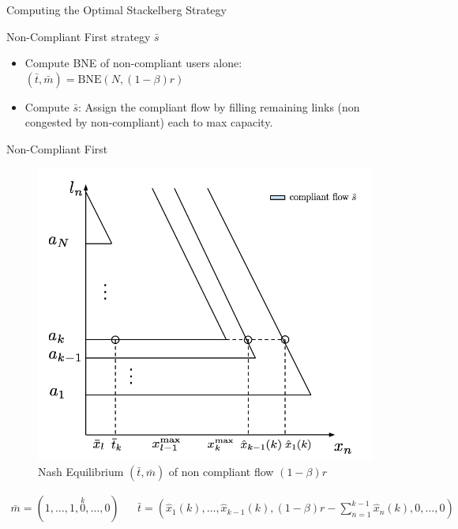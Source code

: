 \documentclass[xcolor=svgnames, english, smaller]{beamer}
\theoremstyle{plain}
\theoremstyle{definition}
\theoremstyle{plain}
\theoremstyle{plain}
\begin{document}
\begin{frame}{Computing the Optimal Stackelberg Strategy}

\begin{block}{Non-Compliant First strategy $\bar{s}$}
\begin{itemize}
\item \alert{Compute BNE of non-compliant users alone: $(\bar{t}, \bar{m}) = \text{BNE}(N, (1-\beta)r)$}
\item Compute $\bar{s}$: Assign the compliant flow by filling remaining links (non congested by non-compliant) each to max capacity.
\end{itemize}
\end{block}

\end{frame}



\begin{frame}{Non-Compliant First}

\begin{figure}
\begin{center}
\includegraphics[scale=0.25]{../../figures/presentation/optimal_stackelberg1.png}
\caption{Nash Equilibrium $(\bar{t}, \bar{m})$ of non compliant flow $(1-\beta)r$}
\end{center}
\end{figure}

\small
\begin{align*}
\bar{m} = (1, \dots, 1, \overset{k}{0}, \dots, 0) &&
\bar{t} = \left( \hat{x}_1(k), \dots, \hat{x}_{k-1}(k), (1-\beta)r - \sum_{n = 1}^{k-1}\hat{x}_n(k), 0, \dots, 0\right)
\end{align*}


\end{frame}
\end{document}

